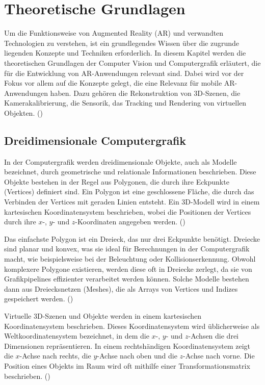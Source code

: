 \chapter{Theoretische Grundlagen}

Um die Funktionsweise von Augmented Reality (AR) und verwandten Technologien zu verstehen, ist ein grundlegendes Wissen über die zugrunde liegenden Konzepte und Techniken erforderlich. In diesem Kapitel werden die theoretischen Grundlagen der Computer Vision und Computergrafik erläutert, die für die Entwicklung von AR-Anwendungen relevant sind. Dabei wird vor der Fokus vor allem auf die Konzepte gelegt, die eine Relevanz für mobile AR-Anwendungen haben. Dazu gehören die Rekonstruktion von 3D-Szenen, die Kamerakalibrierung, die Sensorik, das Tracking und Rendering von virtuellen Objekten. (\cite{doerner2022virtual})

\section{Dreidimensionale Computergrafik}

In der Computergrafik werden dreidimensionale Objekte, auch als Modelle bezeichnet, durch geometrische und relationale Informationen beschrieben. Diese Objekte bestehen in der Regel aus Polygonen, die durch ihre Eckpunkte (Vertices) definiert sind. Ein Polygon ist eine geschlossene Fläche, die durch das Verbinden der Vertices mit geraden Linien entsteht. Ein 3D-Modell wird in einem kartesischen Koordinatensystem beschrieben, wobei die Positionen der Vertices durch ihre \(x\)-, \(y\)- und \(z\)-Koordinaten angegeben werden. (\cite{kore2018space})

Das einfachste Polygon ist ein Dreieck, das nur drei Eckpunkte benötigt. Dreiecke sind planar und konvex, was sie ideal für Berechnungen in der Computergrafik macht, wie beispielsweise bei der Beleuchtung oder Kollisionserkennung. Obwohl komplexere Polygone existieren, werden diese oft in Dreiecke zerlegt, da sie von Grafikpipelines effizienter verarbeitet werden können. Solche Modelle bestehen dann aus Dreiecksnetzen (Meshes), die als Arrays von Vertices und Indizes gespeichert werden. (\cite{wikipedia2023polygons})

Virtuelle 3D-Szenen und Objekte werden in einem kartesischen Koordinatensystem beschrieben. Dieses Koordinatensystem wird üblicherweise als Weltkoordinatensystem bezeichnet, in dem die \(x\)-, \(y\)- und \(z\)-Achsen die drei Dimensionen repräsentieren. In einem rechtshändigen Koordinatensystem zeigt die \(x\)-Achse nach rechts, die \(y\)-Achse nach oben und die \(z\)-Achse nach vorne. Die Position eines Objekts im Raum wird oft mithilfe einer Transformationsmatrix beschrieben. (\cite{appledevdoc, usau2023appleARCamera})

